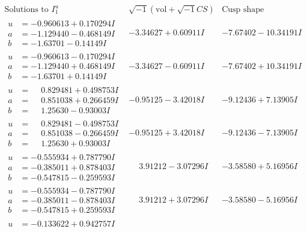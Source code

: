 \documentclass[1p]{elsarticle_modified}
\theoremstyle{definition}
\newcommand{\I}{\sqrt{-1}}
\begin{document}
$$\begin{array}{c|c|c}  
\text{Solutions to }I^u_{1}& \I (\text{vol} + \sqrt{-1}CS) & \text{Cusp shape}\\
 \hline 
\begin{aligned}
u &= -0.960613 + 0.170294 I \\
a &= -1.129440 - 0.468149 I \\
b &= -1.63701 - 0.14149 I\end{aligned}
 & -3.34627 + 0.60911 I & -7.67402 - 10.34191 I \\ \hline\begin{aligned}
u &= -0.960613 - 0.170294 I \\
a &= -1.129440 + 0.468149 I \\
b &= -1.63701 + 0.14149 I\end{aligned}
 & -3.34627 - 0.60911 I & -7.67402 + 10.34191 I \\ \hline\begin{aligned}
u &= \phantom{-}0.829481 + 0.498753 I \\
a &= \phantom{-}0.851038 + 0.266459 I \\
b &= \phantom{-}1.25630 - 0.93003 I\end{aligned}
 & -0.95125 - 3.42018 I & -9.12436 + 7.13905 I \\ \hline\begin{aligned}
u &= \phantom{-}0.829481 - 0.498753 I \\
a &= \phantom{-}0.851038 - 0.266459 I \\
b &= \phantom{-}1.25630 + 0.93003 I\end{aligned}
 & -0.95125 + 3.42018 I & -9.12436 - 7.13905 I \\ \hline\begin{aligned}
u &= -0.555934 + 0.787790 I \\
a &= -0.385011 + 0.878403 I \\
b &= -0.547815 - 0.259593 I\end{aligned}
 & \phantom{-}3.91212 - 3.07296 I & -3.58580 + 5.16956 I \\ \hline\begin{aligned}
u &= -0.555934 - 0.787790 I \\
a &= -0.385011 - 0.878403 I \\
b &= -0.547815 + 0.259593 I\end{aligned}
 & \phantom{-}3.91212 + 3.07296 I & -3.58580 - 5.16956 I \\ \hline\begin{aligned}
u &= -0.133622 + 0.942757 I \\

\end{aligned}
\end{array}$$
\end{document}
